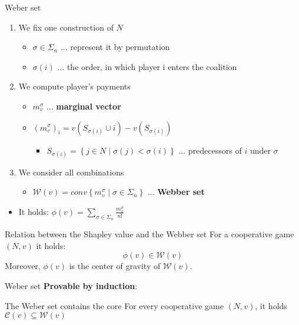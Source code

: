 \documentclass{beamer}
\begin{document}
\begin{frame}{Weber set}
    \begin{enumerate}
		\item We fix one construction of $N$
		\begin{itemize}
			\item $\sigma \in \Sigma_n$ ... represent it by permutation
			\item $\sigma(i)$ ... the order, in which player i enters the coalition
		\end{itemize}
		\item We compute player's payments
		\begin{itemize}
			\item $m^\sigma_v$ ... \textbf{marginal vector}
			\item $\left(m^\sigma_v\right)_i=v\left(S_{\sigma(i)}\cup i\right)-v\left(S_{\sigma(i)}\right)$
			\begin{itemize}
				\item $S_{\sigma(i)}= \left\{j \in N \mid \sigma(j) < \sigma(i)\right\}$ ... predecessors of $i$ under $\sigma$
			\end{itemize}
		\end{itemize}
		\item We consider all combinations
		\begin{itemize}
			\item $\mathcal{W}(v)=conv\left\{m^{\sigma}_{v}\mid \sigma \in \Sigma_n\right\}$ ... \textbf{Webber set}
		\end{itemize}
	\end{enumerate}
	\begin{itemize}
		\item It holds: $\phi(v)=\sum_{\sigma \in \Sigma_n} \frac{m^\sigma_v}{n!}$
	\end{itemize}
	\begin{block}{Relation between the Shapley value and the Webber set}
		For a cooperative game $(N,v)$ it holds:
		\[\phi(v) \in \mathcal{W}(v)\]
		Moreover, $\phi(v)$ is the center of gravity of $\mathcal{W}(v)$.
	\end{block}
\end{frame}



\begin{frame}{Weber set}
    \textbf{Provable by induction}:
	\begin{block}{The Weber set contains the core}
		For every cooperative game $(N,v)$, it holds $\mathcal{C}(v) \subseteq \mathcal{W}(v)$
	\end{block}
\end{frame}
\end{document}
